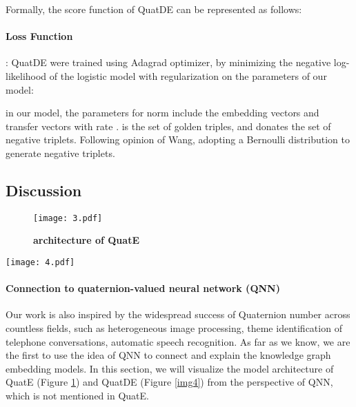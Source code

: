 \documentclass[letterpaper]{article} \usepackage{aaai20}  \usepackage{times}  \usepackage{helvet} \usepackage{courier}  \usepackage[hyphens]{url}  \usepackage{graphicx} \usepackage{lineno,hyperref,amsmath,amssymb}
\begin{document}
Formally, the score function of QuatDE can be represented as follows:



\paragraph{\textbf{Loss Function}}:
QuatDE were trained using Adagrad optimizer, by minimizing the negative log-likelihood of the logistic model with  regularization on the parameters  of our model:

in our model, the parameters  for  norm include the embedding vectors and transfer vectors with rate .  is the set of golden triples, and  donates the set of negative triplets. Following opinion of Wang\cite{wang2014knowledge}, adopting a Bernoulli distribution to generate negative triplets.

\subsection{Discussion}

\begin{figure}[h]
    \centering
    \texttt{[image: 3.pdf]}
    \caption{\textbf{architecture of QuatE}}
    \label{img3}
    \end{figure}
    
    \begin{figure*}[h]
    \centering
    \texttt{[image: 4.pdf]}
    \caption{\textbf{architecture of QuatDE}}
    \label{img4}
    \end{figure*}

\paragraph{\textbf{Connection to quaternion-valued neural network (QNN)}}Our work is also inspired by the widespread success of Quaternion number across countless fields, such as heterogeneous image processing\cite{parcollet2019quaternion}, theme identification of telephone conversations\cite{parcollet2017quaternion}, automatic speech recognition\cite{parcollet2018quaternion}. As far as we know, we are the first to use the idea of QNN to connect and explain the knowledge graph embedding models. In this section, we will visualize the model architecture of QuatE (Figure \ref{img3}) and QuatDE (Figure \ref{img4}) from the perspective of QNN, which is not mentioned in QuatE.
\end{document}
